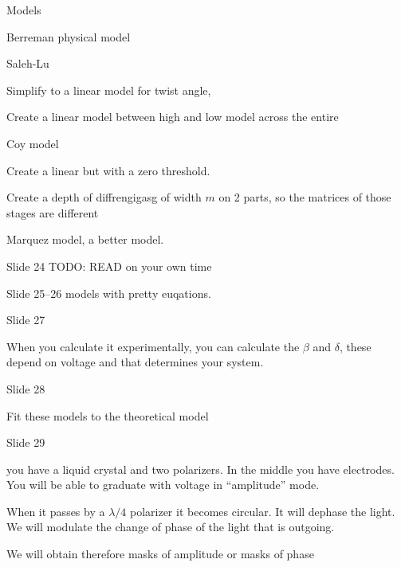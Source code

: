 \documentclass[../main/main.tex]{subfiles}
\begin{document}
Models

Berreman physical model

Saleh-Lu

Simplify to a linear model for twist angle,

Create a linear model between high and low model across the entire

Coy model

Create a linear but with a zero threshold.

Create a depth of diffrengigasg of width $m$ on 2 parts, so the matrices of those stages are different

Marquez model, a better model.

Slide 24 TODO: READ on your own time

Slide 25--26 models with pretty euqations.

Slide 27

When you calculate it experimentally, you can calculate the $\beta$ and $\delta$, these depend on voltage and that determines your system.

Slide 28

Fit these models to the theoretical model

Slide 29

you have a liquid crystal and two polarizers. In the middle you have electrodes. You will be able to graduate with voltage in ``amplitude'' mode.

When it passes by a $\lambda/4$ polarizer it becomes circular. It will dephase the light. We will modulate the change of phase of the light that is outgoing.

We will obtain therefore masks of amplitude or masks of phase
\end{document}
